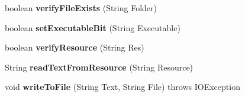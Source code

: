 \begin{DoxyCompactItemize}
\item 
\hypertarget{classCASUAL_1_1FileOperations_a4c17ab8b3acd4d14bebfce16072ee88b}{boolean {\bfseries verify\-File\-Exists} (String Folder)}\label{classCASUAL_1_1FileOperations_a4c17ab8b3acd4d14bebfce16072ee88b}

\item 
\hypertarget{classCASUAL_1_1FileOperations_ad065441f27945626464c5ea2a5b1e453}{boolean {\bfseries set\-Executable\-Bit} (String Executable)}\label{classCASUAL_1_1FileOperations_ad065441f27945626464c5ea2a5b1e453}

\item 
\hypertarget{classCASUAL_1_1FileOperations_aeeab03412b9e7ae3ee245798e1e1b3d8}{boolean {\bfseries verify\-Resource} (String Res)}\label{classCASUAL_1_1FileOperations_aeeab03412b9e7ae3ee245798e1e1b3d8}

\item 
\hypertarget{classCASUAL_1_1FileOperations_af56078757baad2c1f1ce56bbe88ed583}{String {\bfseries read\-Text\-From\-Resource} (String Resource)}\label{classCASUAL_1_1FileOperations_af56078757baad2c1f1ce56bbe88ed583}

\item 
\hypertarget{classCASUAL_1_1FileOperations_a71fbad8531341fe6c2c5212aac13349d}{void {\bfseries write\-To\-File} (String Text, String File)  throws I\-O\-Exception}\label{classCASUAL_1_1FileOperations_a71fbad8531341fe6c2c5212aac13349d}


\end{DoxyCompactItemize}
